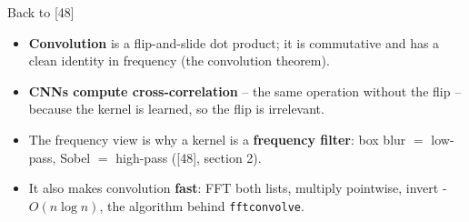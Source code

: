 \documentclass[aspectratio=43]{beamer}
\begin{document}
\begin{frame}{Back to [48]}
  \begin{itemize}\small
    \item \textbf{Convolution} is a flip-and-slide dot product; it is commutative and has a
      clean identity in frequency (the convolution theorem).
    \item \textbf{CNNs compute cross-correlation} -- the same operation without the flip --
      because the kernel is learned, so the flip is irrelevant.
    \item The frequency view is why a kernel is a \textbf{frequency filter}: box blur $=$
      low-pass, Sobel $=$ high-pass ([48], section 2).
    \item It also makes convolution \textbf{fast}: FFT both lists, multiply pointwise,
      invert - $O(n\log n)$, the algorithm behind \texttt{fftconvolve}.
  \end{itemize}
  \vfill
\end{frame}
\end{document}
